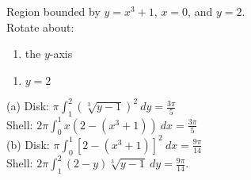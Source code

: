 {Region bounded by $y=x^3+1$, $x=0$, and $y=2$.\\
Rotate about:\\
\begin{minipage}{.5\linewidth}
 \begin{enumerate}
  \item the $y$-axis
 \end{enumerate}
\end{minipage}%
\begin{minipage}{.5\linewidth}
 \begin{enumerate}
  \item $y=2$
 \end{enumerate}
\end{minipage}}
{\noindent
(a) Disk: $\pi \int_1^2(\sqrt[3]{y-1})^2\ dy=\frac{3\pi}5$\\
Shell: $2\pi \int_0^1 x(2-(x^3+1))\ dx=\frac{3\pi}5$\\
(b) Disk: $\pi \int_0^1\left[2-(x^3+1)\right]^2\ dx=\frac{9\pi}{14}$\\
Shell: $2\pi \int_1^2 (2-y)\sqrt[3]{y-1}\ dy=\frac{9\pi}{14}$.}
